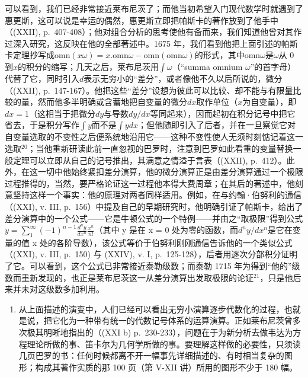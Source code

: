 可以看到，我们已经非常接近莱布尼茨了；而他当初希望入门现代数学时就遇到了惠更斯，这可以说是幸运的偶然，惠更斯立即把帕斯卡的著作放到了他手中（(XXII), p.~407-408）；他对组合分析的思考使他有备而来，我们知道他曾对其作过深入研究，这反映在他的全部著述中。1675 年，我们看到他把上面引述的帕斯卡定理抄写成\(\mathrm{omn}(x\omega) = x.\mathrm{omn}\omega -\mathrm{omn}(\mathrm{omn}\omega)\)的形式，其中\(\mathrm{omn}\omega\)是\(\omega\)从 0 到\(x\)的积分的缩写；几天之后，莱布尼茨用\(\int \omega\)（“summa omnium \(\omega\)”的首字母）代替了它，同时引入\(d\)表示无穷小的“差分”，或者像他不久以后所说的，微分（(XXII), p.~147-167）。他把这些“差分”设想为彼此可以比较、却不能与有限量比较的量，然而他多半明确或含蓄地把自变量的微分\(dx\)取作单位（\(x\)为自变量），即\(dx = 1\)（这相当于把微分\(dy\)与导数\(dy / dx\)等同起来），因而起初在积分记号中把它省去，于是积分写作\(\int y\)而不是\(\int ydx\)；但他随即引入了后者，并在一旦察觉它对自变量选取的不变性之后便系统地沿用它——这种不变性使人无须时刻惦记着这一选取\({}^{20}\)；当他重新研读此前一直忽视的巴罗时，注意到巴罗如此看重的变量替换一般定理可以立即从自己的记号推出，其满意之情溢于言表（(XXII), p.~412）。此外，在这一切中他始终紧扣差分演算，他的微分演算正是由差分演算通过一个极限过程推得的，当然，要严格论证这一过程他本得大费周章；在其后的著述中，他刻意坚持这样一个事实：他的原理对两者同样适用。例如，在与约翰·伯努利的通信（(XXI), v. III, p.~156）中提及自己的早期研究时，他明确引证了帕斯卡，给出了差分演算中的一个公式——它是牛顿公式的一个特例——并由之“取极限”得到公式\(y = \sum_{1}^{\infty} (-1)^{n-1} \frac{d^{n}y}{dx^{n}} \frac{x^{n}}{n!}\)（其中 y 是在 x = 0 处为零的函数，而\(d^{n}y/dx^{n}\)是它在变量的值 x 处的各阶导数），该公式等价于伯努利刚刚通信告诉他的一个类似公式（(XXI), v. III, p.~150) 与 (XXIV), v. I, p.~125-128），后者用逐次分部积分证明了它。可以看到，这个公式已非常接近泰勒级数；而泰勒 1715 年为得到“他的”级数而重新发现的，也正是莱布尼茨这一从差分演算出发取极限的论证\(^{21}\)，只是他后来并未对这级数多加利用。

\begin{enumerate}
\def\labelenumi{\Alph{enumi})}
\setcounter{enumi}{5}
\tightlist
\item
  从上面描述的演变中，人们已经可以看出无穷小演算逐步代数化的过程，也就是说，把它化为一种带有统一的代数记号体系的运算演算。正如莱布尼茨曾多次极其明晰地指出的（(XXI b) p.~230-233），问题在于为新分析去做韦达为方程理论所做的事、笛卡尔为几何学所做的事。要理解这样做的必要性，只须读几页巴罗的书：任何时候都离不开一幅事先详细描述的、有时相当复杂的图形；构成其著作实质的那 100 页（第 V-XII 讲）所用的图形不少于 180 幅。
\end{enumerate}

